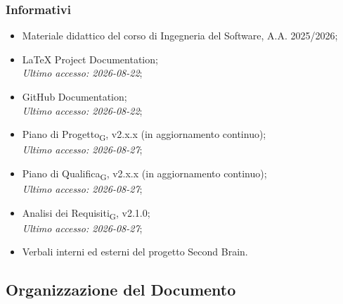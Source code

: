 \subsubsection{Informativi}

\begin{itemize}

    \item Materiale didattico del corso di Ingegneria del Software, A.A. 2025/2026;

    \item
    {\LaTeX{} Project Documentation}; \\
    \textit{Ultimo accesso: 2026-08-22};

    \item
    {GitHub Documentation}; \\
    \textit{Ultimo accesso: 2026-08-22};

    \item
    {Piano di Progetto\textsubscript{G}}, v2.x.x (in aggiornamento continuo); \\
    \textit{Ultimo accesso: 2026-08-27};

    \item
    {Piano di Qualifica\textsubscript{G}}, v2.x.x (in aggiornamento continuo); \\
    \textit{Ultimo accesso: 2026-08-27};

    \item
    {Analisi dei Requisiti\textsubscript{G}}, v2.1.0; \\
    \textit{Ultimo accesso: 2026-08-27};

    \item Verbali interni ed esterni del progetto Second Brain.

\end{itemize}


\subsection{Organizzazione del Documento}


